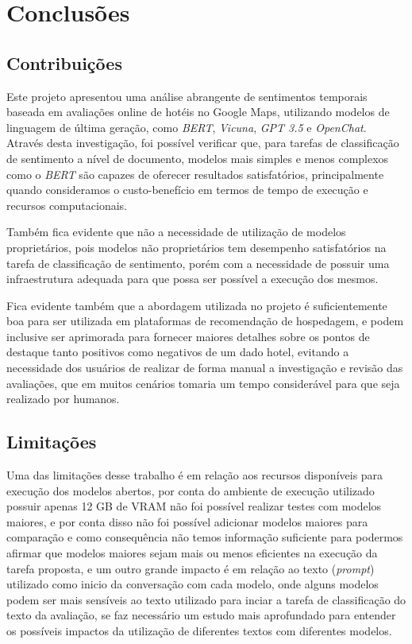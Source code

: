 \chapter{Conclusões}
\label{cap:conclusao}

\section{Contribuições}
\label{cap:conclusao:sec:contribuicoes}

Este projeto apresentou uma análise abrangente de sentimentos temporais baseada em avaliações online de hotéis no Google Maps, utilizando modelos de linguagem de última geração, como \textit{BERT}, \textit{Vicuna}, \textit{GPT 3.5} e \textit{OpenChat}. Através desta investigação, foi possível verificar que, para tarefas de classificação de sentimento a nível de documento, modelos mais simples e menos complexos como o \textit{BERT} são capazes de oferecer resultados satisfatórios, principalmente quando consideramos o custo-benefício em termos de tempo de execução e recursos computacionais.

Também fica evidente que não a necessidade de utilização de modelos proprietários, pois modelos não proprietários tem desempenho satisfatórios na tarefa de classificação de sentimento, porém com a necessidade de possuir uma infraestrutura adequada para que possa ser possível a execução dos mesmos.

Fica evidente também que a abordagem utilizada no projeto é suficientemente boa para ser utilizada em plataformas de recomendação de hospedagem, e podem inclusive ser aprimorada para fornecer maiores detalhes sobre os pontos de destaque tanto positivos como negativos de um dado hotel, evitando a necessidade dos usuários de realizar de forma manual a investigação e revisão das avaliações, que em muitos cenários tomaria um tempo considerável para que seja realizado por humanos.

\section{Limitações}
\label{cap:conclusao:sec:limitacoes}

Uma das limitações desse trabalho é em relação aos recursos disponíveis para execução dos modelos abertos, por conta do ambiente de execução utilizado possuir apenas 12 GB de VRAM não foi possível realizar testes com modelos maiores, e por conta disso não foi possível adicionar modelos maiores para comparação e como consequência não temos informação suficiente para podermos afirmar que modelos maiores sejam mais ou menos eficientes na execução da tarefa proposta, e um outro grande impacto é em relação ao texto (\textit{prompt}) utilizado como inicio da conversação com cada modelo, onde alguns modelos podem ser mais sensíveis ao texto utilizado para inciar a tarefa de classificação do texto da avaliação, se faz necessário um estudo mais aprofundado para entender os possíveis impactos da utilização de diferentes textos com diferentes modelos.

